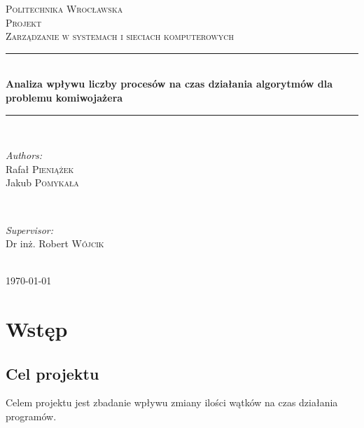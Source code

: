 \documentclass{article}
\begin{document}
	
	\begin{titlepage}
		\center
		\newcommand{\HRule}{\rule{\linewidth}{0.5mm}}
		
		\textsc{\LARGE Politechnika Wrocławska}\\[1.5cm]
		\textsc{\Large Projekt}\\[0.5cm] 
		\textsc{\large Zarządzanie w systemach i sieciach komputerowych}\\[0.5cm] 

		\HRule \\[0.4cm]
		{ \huge \bfseries Analiza wpływu liczby procesów na czas działania algorytmów dla problemu komiwojażera}\\[0.4cm]
		\HRule \\[1.5cm]
		
		\begin{minipage}{0.4\textwidth}
			\begin{flushleft} \large
				\emph{Authors:}\\
				Rafał \textsc{Pieniążek} 
				\\ Jakub \textsc{Pomykała}
			\end{flushleft}
		\end{minipage}
		~
		\begin{minipage}{0.4\textwidth}
			\begin{flushright} \large
				\emph{Supervisor:} \\
				Dr inż. Robert \textsc{Wójcik} 
			\end{flushright}
		\end{minipage}\\[4cm]

		{\large \today}\\[3cm]
		
		\vfill
		
	\end{titlepage}

\tableofcontents

\newpage
	
\listoffigures
\newpage

\listoftables	
\newpage

	
	
\section{Wstęp}
	\subsection{Cel projektu}
		Celem projektu jest zbadanie wpływu zmiany ilości wątków na czas działania programów.
\end{document}
